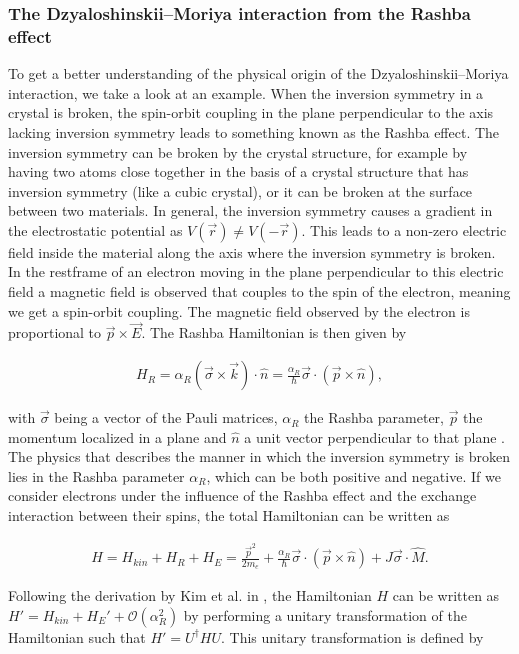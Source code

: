\documentclass[1p]{elsarticle}		%
\DeclareRobustCommand{\orderof}{\ensuremath{\mathcal{O}}}
\numberwithin{equation}{section}
\begin{document}
\subsubsection{The Dzyaloshinskii--Moriya interaction from the Rashba effect}
To get a better understanding of the physical origin of the Dzyaloshinskii--Moriya interaction, we take a look at an example. When the inversion symmetry in a crystal is broken, the spin-orbit coupling in the plane perpendicular to the axis lacking inversion symmetry leads to something known as the Rashba effect. The inversion symmetry can be broken by the crystal structure, for example by having two atoms close together in the basis of a crystal structure that has inversion symmetry (like a cubic crystal), or it can be broken at the surface between two materials. In general, the inversion symmetry causes a gradient in the electrostatic potential as $V(\vec{r}) \neq V(-\vec{r})$. This leads to a non-zero electric field inside the material along the axis where the inversion symmetry is broken. In the restframe of an electron moving in the plane perpendicular to this electric field a magnetic field is observed that couples to the spin of the electron, meaning we get a spin-orbit coupling. The magnetic field observed by the electron is proportional to $\vec{p}\times\vec{E}$. The Rashba Hamiltonian is then given by

\begin{align}
\label{eq:RashbaH}
H_R = \alpha_R (\vec{\sigma} \times \vec{k})\cdot \hat{n} = \frac{\alpha_R}{\hbar} \vec{\sigma}\cdot(\vec{p}\times\hat{n}),
\end{align}

with $\vec{\sigma}$ being a vector of the Pauli matrices, $\alpha_R$ the Rashba parameter, $\vec{p}$ the momentum localized in a plane and $\hat{n}$ a unit vector perpendicular to that plane \cite{BychovRashba1984}. The physics that describes the manner in which the inversion symmetry is broken lies in the Rashba parameter $\alpha_R$, which can be both positive and negative. If we consider electrons under the influence of the Rashba effect and the exchange interaction between their spins, the total Hamiltonian can be written as

\begin{align}
\label{eq:RashbaModel}
H = H_{kin} + H_R + H_E = \frac{\vec{p}^2}{2m_e} + \frac{\alpha_R}{\hbar} \vec{\sigma}\cdot(\vec{p}\times\hat{n}) + J \vec{\sigma}\cdot\hat{M}.
\end{align}

Following the derivation by Kim et al. in \cite{DMIfromRashba_Kim}, the Hamiltonian $H$ can be written as $H'=H_{kin}+H_E'+\orderof(\alpha_R^2)$ by performing a unitary transformation of the Hamiltonian such that $H' = U^{\dagger}HU$. This unitary transformation is defined by
\end{document}
